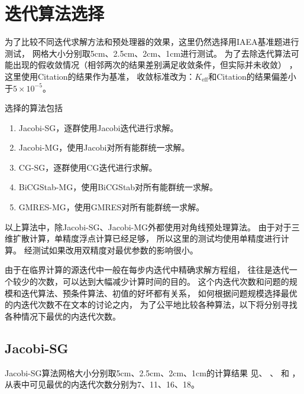\section{迭代算法选择}

为了比较不同迭代求解方法和预处理器的效果，这里仍然选择用IAEA基准题进行测试，
网格大小分别取5cm、2.5cm、2cm、1cm进行测试。
为了去除迭代算法可能出现的假收敛情况（相邻两次的结果差别满足收敛条件，但实际并未收敛）
，这里使用Citation的结果作为基准，
收敛标准改为：$K_\mathrm{eff}$和Citation的结果偏差小于$5\times10^{-5}$。

选择的算法包括
\begin{enumerate}
\item Jacobi-SG，逐群使用Jacobi迭代进行求解。
\item Jacobi-MG，使用Jacobi对所有能群统一求解。
\item CG-SG，逐群使用CG迭代进行求解。
\item BiCGStab-MG，使用BiCGStab对所有能群统一求解。
\item GMRES-MG，使用GMRES对所有能群统一求解。
\end{enumerate}
以上算法中，除Jacobi-SG、Jacobi-MG外都使用对角线预处理算法。
由于对于三维扩散计算，单精度浮点计算已经足够，
所以这里的测试均使用单精度进行计算。
经测试如果改用双精度对最优参数的影响很小。

由于在临界计算的源迭代中一般在每步内迭代中精确求解方程组，
往往是迭代一个较少的次数，可以达到大幅减少计算时间的目的。
这个内迭代次数和问题的规模和迭代算法、预条件算法、初值的好坏都有关系，
如何根据问题规模选择最优的内迭代次数不在文本的讨论之内，
为了公平地比较各种算法，以下将分别寻找各种情况下最优的内迭代次数。

\subsection{Jacobi-SG}
\label{sec:equsolve.iter.jacobi-sg}

Jacobi-SG算法网格大小分别取5cm、2.5cm、2cm、1cm的计算结果
见、%
、%
和%
，
从表中可见最优的内迭代次数分别为7、11、16、18。

